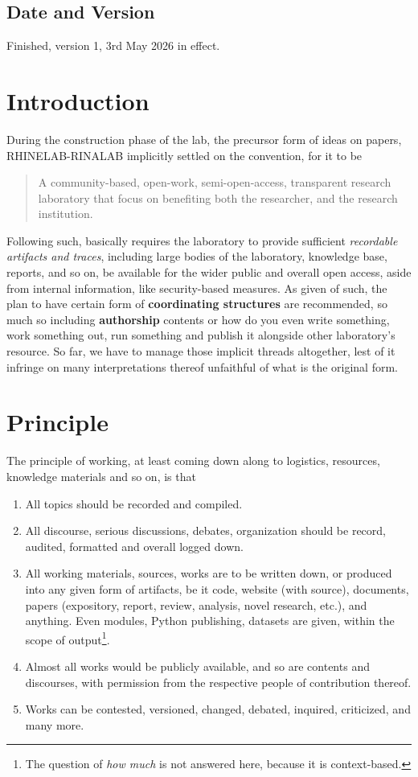 \documentclass[10pt,a4paper]{article}
\begin{document}
\subsection{Date and Version}

Finished, version 1, 3rd May 2026 in effect. 

\section{Introduction}

During the construction phase of the lab, the precursor form of ideas on papers, RHINELAB-RINALAB implicitly settled on the convention, for it to be 
\begin{quote}
    A community-based, open-work, semi-open-access, transparent research laboratory that focus on benefiting both the researcher, and the research institution.  
\end{quote}
Following such, basically requires the laboratory to provide sufficient \textit{recordable artifacts and traces}, including large bodies of the laboratory, knowledge base, reports, and so on, be available for the wider public and overall open access, aside from internal information, like security-based measures. As given of such, the plan to have certain form of \textbf{coordinating structures} are recommended, so much so including \textbf{authorship} contents or how do you even write something, work something out, run something and publish it alongside other laboratory's resource. So far, we have to manage those implicit threads altogether, lest of it infringe on many interpretations thereof unfaithful of what is the original form. 

\section{Principle}

The principle of working, at least coming down along to logistics, resources, knowledge materials and so on, is that
\begin{enumerate}
    \item All topics should be recorded and compiled. 
    \item All discourse, serious discussions, debates, organization should be record, audited, formatted and overall logged down. 
    \item All working materials, sources, works are to be written down, or produced into any given form of artifacts, be it code, website (with source), documents, papers (expository, report, review, analysis, novel research, etc.), and anything. Even modules, Python publishing, datasets are given, within the scope of output\footnote{The question of \textit{how much} is not answered here, because it is context-based.}.
    \item Almost all works would be publicly available, and so are contents and discourses, with permission from the respective people of contribution thereof. 
    \item Works can be contested, versioned, changed, debated, inquired, criticized, and many more. 
\end{enumerate}
\end{document}
